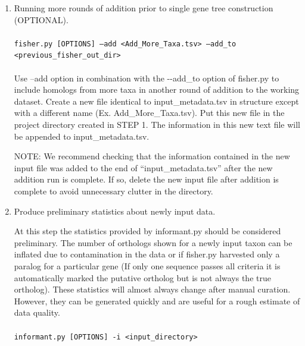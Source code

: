 \documentclass{article}
\def\code#1{\texttt{#1}}
\begin{document}
\begin{enumerate}[itemsep=12pt]
        \item Running more rounds of addition prior to single gene tree construction (OPTIONAL).
        \\\\
        \code{fisher.py [OPTIONS] --add <Add\_More\_Taxa.tsv> --add\_to <previous\_fisher\_out\_dir>}
        \\\\
        Use --add option in combination with the -\/-add\_to option of fisher.py to include homologs from more taxa in another round of addition to the working dataset. Create a new file identical to input\_metadata.tsv in structure except with a different name (Ex. Add\_More\_Taxa.tsv). Put this new file in the project directory created in STEP 1. The information in this new text file will be appended to input\_metadata.tsv.
        
        \vspace{0.1cm}
        NOTE: We recommend checking that the information contained in the new input file was added to the end of “input\_metadata.tsv” after the new addition run is complete. If so, delete the new input file after addition is complete to avoid unnecessary clutter in the directory.
        
        \item Produce preliminary statistics about newly input data.
        
        At this step the statistics provided by informant.py should be considered preliminary. The number of orthologs shown for a newly input taxon can be inflated due to contamination in the data or if fisher.py harvested only a paralog for a particular gene (If only one sequence passes all criteria it is automatically marked the putative ortholog but is not always the true ortholog). These statistics will almost always change after manual curation. However, they can be generated quickly and are useful for a rough estimate of data quality.
        \\\\
        \code{informant.py [OPTIONS] -i <input\_directory>}
        \vspace{0.2cm}
    

\end{enumerate}
\end{document}

